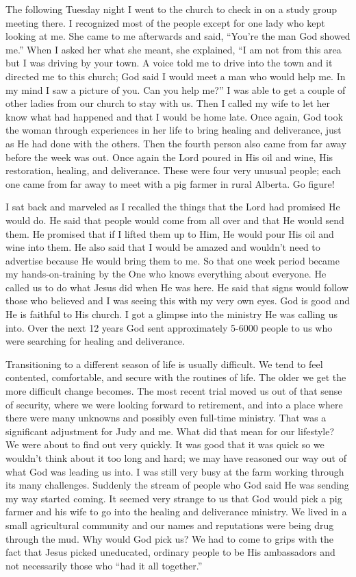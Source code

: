 \documentclass[oneside]{book}
\begin{document}
The following Tuesday night I went to the church to check in on a study group meeting there. I recognized most of the people except for one lady who kept looking at me. She came to me afterwards and said, “You're the man God showed me.” When I asked her what she meant, she explained, “I am not from this area but I was driving by your town. A voice told me to drive into the town and it directed me to this church; God said I would meet a man who would help me. In my mind I saw a picture of you. Can you help me?”  I was able to get a couple of other ladies from our church to stay with us. Then I called my wife to let her know what had happened and that I would be home late. Once again, God took the woman through experiences in her life to bring healing and deliverance, just as He had done with the others. Then the fourth person also came from far away before the week was out. Once again the Lord poured in His oil and wine, His restoration, healing, and deliverance. These were four very unusual people; each one came from far away to meet with a pig farmer in rural Alberta. Go figure!

I sat back and marveled as I recalled the things that the Lord had promised He would do. He said that people would come from all over and that He would send them. He promised that if I lifted them up to Him, He would pour His oil and wine into them. He also said that I would be amazed and wouldn’t need to advertise because He would bring them to me. So that one week period became my hands-on-training by the One who knows everything about everyone. He called us to do what Jesus did when He was here. He said that signs would follow those who believed and I was seeing this with my very own eyes. God is good and He is faithful to His church. I got a glimpse into the ministry He was calling us into. Over the next 12 years God sent approximately 5-6000 people to us who were searching for healing and deliverance. 

Transitioning to a different season of life is usually difficult. We tend to feel contented, comfortable, and secure with the routines of life. The older we get the more difficult change becomes. The most recent trial moved us out of that sense of security, where we were looking forward to retirement, and into a place where there were many unknowns and possibly even full-time ministry. That was a significant adjustment for Judy and me. What did that mean for our lifestyle? We were about to find out very quickly. It was good that it was quick so we wouldn’t think about it too long and hard; we may have reasoned our way out of what God was leading us into. I was still very busy at the farm working through its many challenges. Suddenly the stream of people who God said He was sending my way started coming. It seemed very strange to us that God would pick a pig farmer and his wife to go into the healing and deliverance ministry. We lived in a small agricultural community and our names and reputations were being drug through the mud. Why would God pick us? We had to come to grips with the fact that Jesus picked uneducated, ordinary people to be His ambassadors and not necessarily those who “had it all together.” 
\end{document}
